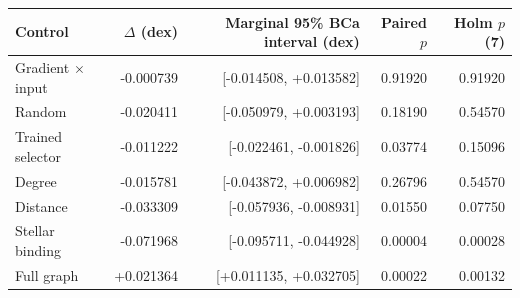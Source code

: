 \begin{tabular}{lrrrr}
\toprule
Control & $\Delta$ (dex) & Marginal 95\% BCa interval (dex) & Paired $p$ & Holm $p$ (7) \\
\midrule
Gradient $\times$ input & -0.000739 & [-0.014508, +0.013582] & 0.91920 & 0.91920 \\
Random & -0.020411 & [-0.050979, +0.003193] & 0.18190 & 0.54570 \\
Trained selector & -0.011222 & [-0.022461, -0.001826] & 0.03774 & 0.15096 \\
Degree & -0.015781 & [-0.043872, +0.006982] & 0.26796 & 0.54570 \\
Distance & -0.033309 & [-0.057936, -0.008931] & 0.01550 & 0.07750 \\
Stellar binding & -0.071968 & [-0.095711, -0.044928] & 0.00004 & 0.00028 \\
Full graph & +0.021364 & [+0.011135, +0.032705] & 0.00022 & 0.00132 \\
\bottomrule
\end{tabular}
